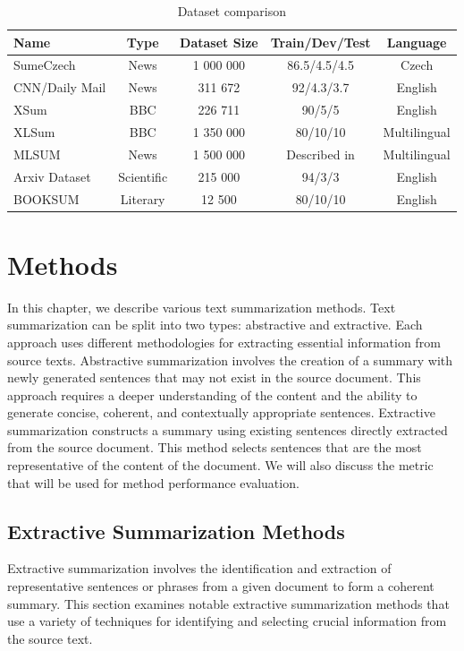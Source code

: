\documentclass[english, ba, kiv, he, iso690numb, pdf, viewonly]{fasthesis}
\begin{document}
\begin{table}[htbp]
    \centering
    \caption{Dataset comparison}
    \label{tab:datasets}
    \begin{tabular}{lcccc}
        \toprule
        \textbf{Name} & \textbf{Type} & \textbf{Dataset Size} & \textbf{Train/Dev/Test} & \textbf{Language} \\
        \midrule
        SumeCzech & News & 1 000 000 & 86.5/4.5/4.5 & Czech \\
        CNN/Daily Mail & News & 311 672 & 92/4.3/3.7 & English \\
        XSum & BBC & 226 711 & 90/5/5 & English \\
        XLSum & BBC & 1 350 000 & 80/10/10 & Multilingual \\
        MLSUM & News & 1 500 000 & Described in \cite{scialom2020mlsum} & Multilingual \\
        Arxiv Dataset & Scientific & 215 000 & 94/3/3 & English \\
        BOOKSUM & Literary & 12 500 & 80/10/10 & English \\
        \bottomrule
    \end{tabular}
\end{table}


%
%
%
%
\chapter{Methods} \label{methods}
In this chapter, we describe various text summarization methods.  
Text summarization can be split into two types: abstractive and extractive. Each approach uses different methodologies for extracting essential information from source texts. Abstractive summarization involves the creation of a summary with newly generated sentences that may not exist in the source document. This approach requires a deeper understanding of the content and the ability to generate concise, coherent, and contextually appropriate sentences. Extractive summarization constructs a summary using existing sentences directly extracted from the source document. This method selects sentences that are the most representative of the content of the document. We will also discuss the metric that will be used for method performance evaluation.
\section{Extractive Summarization Methods}
Extractive summarization involves the identification and extraction of representative sentences or phrases from a given document to form a coherent summary. This section examines notable extractive summarization methods that use a variety of techniques for identifying and selecting crucial information from the source text.
\end{document}
